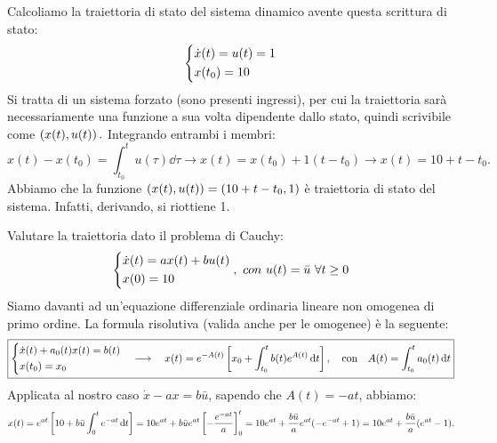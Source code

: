 \documentclass[a4paper]{report}
\begin{document}
\begin{esem}
	Calcoliamo la traiettoria di stato del sistema dinamico avente questa scrittura di stato:
	$$
	\begin{dcases}
	\dot x(t) = u(t) = 1 \\
	x(t_0)=10	
	\end{dcases}
	$$
	Si tratta di un sistema forzato (sono presenti ingressi), per cui la traiettoria sarà necessariamente una funzione a sua volta dipendente dallo stato, quindi scrivibile come $\left( x(t), u(t) \right).$
	Integrando entrambi i membri:
	\begin{equation*}
		x(t) - x(t_0)=\int_{t_0}^{t}u(\tau) \dd{\tau} \rightarrow x(t) = x(t_0)+1(t-t_0) \rightarrow x(t) = 10 + t - t_0.
 	\end{equation*}
 	Abbiamo che la funzione $\left( x(t), u(t) \right) = (10 + t-t_0, 1)$ è traiettoria di stato del sistema. Infatti, derivando, si riottiene 1.
\end{esem}

\begin{esem}
	Valutare la traiettoria dato il problema di Cauchy:
	\begin{equation*}
		\begin{dcases}
			\dot x(t) = ax(t)+bu(t) \\
			x(0)=10
		\end{dcases},
		\ con \ u(t) = \bar u \ \forall t \geq 0
	\end{equation*}
	Siamo davanti ad un'equazione differenziale ordinaria lineare non omogenea di primo ordine. La formula risolutiva (valida anche per le omogenee) è la seguente:
	\begin{equation}
		\boxed{\begin{dcases}
			\dot x(t) + a_0(t)x(t)=b(t) \\
			x(t_0) = x_0
			\end{dcases} \quad \longrightarrow \quad x(t) = e^{-A(t)} \left[ x_0 + \int_{t_0}^t b(t)e^{A(t)}\dd{t} \right], \quad \textrm{con} \quad A(t) = \int_{t_0}^t a_0(t)\dd{t}}
	\end{equation}
	Applicata al nostro caso $\dot x-ax=b\bar u$, sapendo che $A(t) = -at$, abbiamo:
	\begin{equation*}
		x(t) = e^{at}\left[ 10+b\bar u\int_0^t e^{-at} \dd{t} \right] = 10 e^{at}+ b\bar ue^{at}\left[ -\frac{e^{-at}}{a} \right]_0^t = 10e^{at} +\frac{b\bar u}{a} e^{at}(-e^{-at}+ 1) = 10e^{at} + \frac{b\bar u}{a}(e^{at} - 1).
	\end{equation*}
\end{esem}
\end{document}

